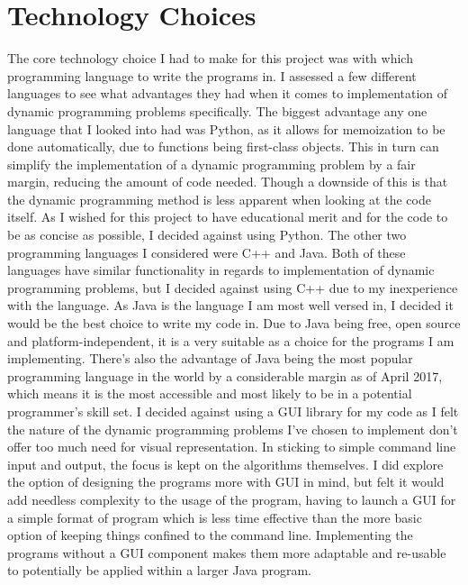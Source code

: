 \section{Technology Choices}
The core technology choice I had to make for this project was with which programming language to write the programs in. I assessed a few different languages to see what advantages they had when it comes to implementation of dynamic programming problems specifically. The biggest advantage any one language that I looked into had was Python, as it allows for memoization to be done automatically, due to functions being first-class objects. This in turn can simplify the implementation of a dynamic programming problem by a fair margin, reducing the amount of code needed. Though a downside of this is that the dynamic programming method is less apparent when looking at the code itself. As I wished for this project to have educational merit and for the code to be as concise as possible, I decided against using Python. The other two programming languages I considered were C++ and Java. Both of these languages have similar functionality in regards to implementation of dynamic programming problems, but I decided against using C++ due to my inexperience with the language. As Java is the language I am most well versed in, I decided it would be the best choice to write my code in. Due to Java being free, open source and platform-independent, it is a very suitable as a choice for the programs I am implementing. There's also the advantage of Java being the most popular programming language in the world by a considerable margin as of April 2017\cite{Java-Pop}, which means it is the most accessible and most likely to be in a potential programmer's skill set.
\smallbreak
I decided against using a GUI library for my code as I felt the nature of the dynamic programming problems I've chosen to implement don't offer too much need for visual representation. In sticking to simple command line input and output, the focus is kept on the algorithms themselves. I did explore the option of designing the programs more with GUI in mind, but felt it would add needless complexity to the usage of the program, having to launch a GUI for a simple format of program which is less time effective than the more basic option of keeping things confined to the command line. Implementing the programs without a GUI component makes them more adaptable and re-usable to potentially be applied within a larger Java program.